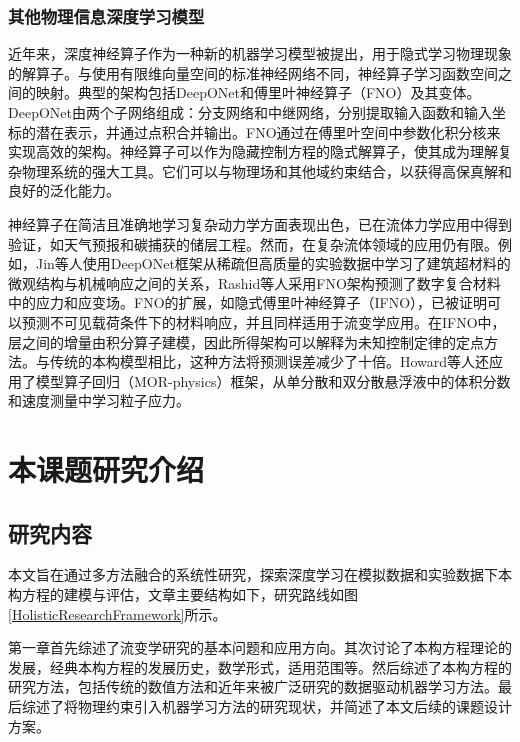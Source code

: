 \subsubsection{其他物理信息深度学习模型}
近年来，深度神经算子作为一种新的机器学习模型被提出，用于隐式学习物理现象的解算子。与使用有限维向量空间的标准神经网络不同，神经算子学习函数空间之间的映射。典型的架构包括DeepONet和傅里叶神经算子（FNO）及其变体。DeepONet由两个子网络组成：分支网络和中继网络，分别提取输入函数和输入坐标的潜在表示，并通过点积合并输出。FNO通过在傅里叶空间中参数化积分核来实现高效的架构。神经算子可以作为隐藏控制方程的隐式解算子，使其成为理解复杂物理系统的强大工具。它们可以与物理场和其他域约束结合，以获得高保真解和良好的泛化能力。

神经算子在简洁且准确地学习复杂动力学方面表现出色，已在流体力学应用中得到验证，如天气预报和碳捕获的储层工程。然而，在复杂流体领域的应用仍有限。例如，Jin等人使用DeepONet框架从稀疏但高质量的实验数据中学习了建筑超材料的微观结构与机械响应之间的关系，Rashid等人采用FNO架构预测了数字复合材料中的应力和应变场。FNO的扩展，如隐式傅里叶神经算子（IFNO），已被证明可以预测不可见载荷条件下的材料响应，并且同样适用于流变学应用。在IFNO中，层之间的增量由积分算子建模，因此所得架构可以解释为未知控制定律的定点方法。与传统的本构模型相比，这种方法将预测误差减少了十倍。Howard等人还应用了模型算子回归（MOR-physics）框架，从单分散和双分散悬浮液中的体积分数和速度测量中学习粒子应力。

\section{本课题研究介绍}
\subsection{研究内容}
本文旨在通过多方法融合的系统性研究，探索深度学习在模拟数据和实验数据下本构方程的建模与评估，文章主要结构如下，研究路线如图\ref{HolisticResearchFramework}所示。

第一章首先综述了流变学研究的基本问题和应用方向。其次讨论了本构方程理论的发展，经典本构方程的发展历史，数学形式，适用范围等。然后综述了本构方程的研究方法，包括传统的数值方法和近年来被广泛研究的数据驱动机器学习方法。最后综述了将物理约束引入机器学习方法的研究现状，并简述了本文后续的课题设计方案。

